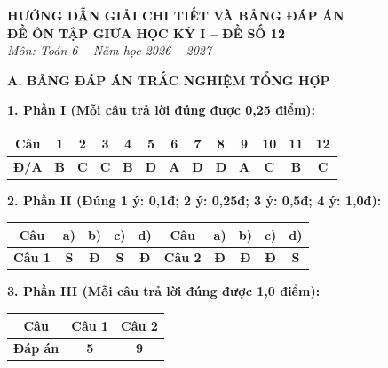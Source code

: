 \documentclass[12pt,a4paper]{article}
\begin{document}
\begin{center}
  \textbf{\Large HƯỚNG DẪN GIẢI CHI TIẾT VÀ BẢNG ĐÁP ÁN}\\
  \textbf{\large ĐỀ ÔN TẬP GIỮA HỌC KỲ I -- ĐỀ SỐ 12}\\
  \textit{Môn: Toán 6 -- Năm học 2026 -- 2027}
\end{center}
\vspace{2mm}

\noindent\textbf{\large A. BẢNG ĐÁP ÁN TRẮC NGHIỆM TỔNG HỢP}
\vspace{1.5mm}

\noindent\textbf{1. Phần I (Mỗi câu trả lời đúng được 0,25 điểm):}
\begin{center}
\begin{tabular}{|c|c|c|c|c|c|c|c|c|c|c|c|c|}
\hline
\textbf{Câu} & \textbf{1} & \textbf{2} & \textbf{3} & \textbf{4} & \textbf{5} & \textbf{6} & \textbf{7} & \textbf{8} & \textbf{9} & \textbf{10} & \textbf{11} & \textbf{12} \\
\hline
\textbf{Đ/A} & \textbf{B} & \textbf{C} & \textbf{C} & \textbf{B} & \textbf{D} & \textbf{A} & \textbf{D} & \textbf{D} & \textbf{A} & \textbf{C} & \textbf{B} & \textbf{C} \\
\hline
\end{tabular}
\end{center}
\vspace{1mm}

\noindent\textbf{2. Phần II (Đúng 1 ý: 0,1đ; 2 ý: 0,25đ; 3 ý: 0,5đ; 4 ý: 1,0đ):}
\begin{center}
\begin{tabular}{|c|c|c|c|c||c|c|c|c|c|}
\hline
\textbf{Câu} & \textbf{a)} & \textbf{b)} & \textbf{c)} & \textbf{d)} & \textbf{Câu} & \textbf{a)} & \textbf{b)} & \textbf{c)} & \textbf{d)} \\
\hline
\textbf{Câu 1} & \textbf{S} & \textbf{Đ} & \textbf{S} & \textbf{Đ} & \textbf{Câu 2} & \textbf{Đ} & \textbf{Đ} & \textbf{Đ} & \textbf{S} \\
\hline
\end{tabular}
\end{center}
\vspace{1mm}

\noindent\textbf{3. Phần III (Mỗi câu trả lời đúng được 1,0 điểm):}
\begin{center}
\begin{tabular}{|c|c|c|}
\hline
\textbf{Câu} & \textbf{Câu 1} & \textbf{Câu 2} \\
\hline
\textbf{Đáp án} & \textbf{5} & \textbf{9} \\
\hline
\end{tabular}
\end{center}
\vspace{3mm}
\end{document}
